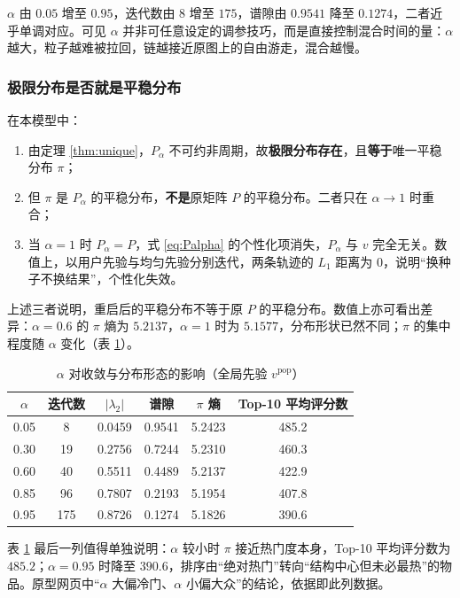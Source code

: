\documentclass[12pt,a4paper]{ctexart}
\begin{document}
$\alpha$ 由 $0.05$ 增至 $0.95$，迭代数由 $8$ 增至 $175$，谱隙由 $0.9541$ 降至 $0.1274$，二者近乎单调对应。可见 $\alpha$ 并非可任意设定的调参技巧，而是直接控制混合时间的量：$\alpha$ 越大，粒子越难被拉回，链越接近原图上的自由游走，混合越慢。

\subsubsection{极限分布是否就是平稳分布}

在本模型中：

\begin{enumerate}[label=(\arabic*),leftmargin=2.2em]
\item 由定理 \ref{thm:unique}，$P_{\alpha}$ 不可约非周期，故\textbf{极限分布存在}，且\textbf{等于}唯一平稳分布 $\pi$；
\item 但 $\pi$ 是 $P_{\alpha}$ 的平稳分布，\textbf{不是}原矩阵 $P$ 的平稳分布。二者只在 $\alpha\to1$ 时重合；
\item 当 $\alpha=1$ 时 $P_{\alpha}=P$，式 \eqref{eq:Palpha} 的个性化项消失，$P_{\alpha}$ 与 $v$ 完全无关。数值上，以用户先验与均匀先验分别迭代，两条轨迹的 $L_1$ 距离为 $0$，说明“换种子不换结果”，个性化失效。
\end{enumerate}

上述三者说明，重启后的平稳分布不等于原 $P$ 的平稳分布。数值上亦可看出差异：$\alpha=0.6$ 的 $\pi$ 熵为 $5.2137$，$\alpha=1$ 时为 $5.1577$，分布形状已然不同；$\pi$ 的集中程度随 $\alpha$ 变化（表 \ref{tab:alpha}）。

\begin{table}[H]
\centering
\caption{$\alpha$ 对收敛与分布形态的影响（全局先验 $v^{\mathrm{pop}}$）}
\label{tab:alpha}
\small
\begin{tabular}{cccccc}
\toprule
$\alpha$ & 迭代数 & $|\lambda_2|$ & 谱隙 & $\pi$ 熵 & Top-10 平均评分数 \\
\midrule
0.05 & 8   & 0.0459 & 0.9541 & 5.2423 & 485.2 \\
0.30 & 19  & 0.2756 & 0.7244 & 5.2310 & 460.3 \\
0.60 & 40  & 0.5511 & 0.4489 & 5.2137 & 422.9 \\
0.85 & 96  & 0.7807 & 0.2193 & 5.1954 & 407.8 \\
0.95 & 175 & 0.8726 & 0.1274 & 5.1826 & 390.6 \\
\bottomrule
\end{tabular}
\end{table}

表 \ref{tab:alpha} 最后一列值得单独说明：$\alpha$ 较小时 $\pi$ 接近热门度本身，Top-10 平均评分数为 $485.2$；$\alpha=0.95$ 时降至 $390.6$，排序由“绝对热门”转向“结构中心但未必最热”的物品。原型网页中“$\alpha$ 大偏冷门、$\alpha$ 小偏大众”的结论，依据即此列数据。
\end{document}
